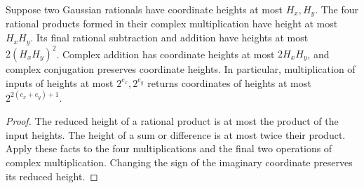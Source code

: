 \begin{lemma}
    \label{lem:lvv_complex_arithmetic_heights}
    \leanok
    Suppose two Gaussian rationals have coordinate heights at most
    $H_x,H_y$. The four rational products formed in their complex
    multiplication have height at most $H_xH_y$. Its final rational
    subtraction and addition have heights at most $2(H_xH_y)^2$.
    Complex addition has coordinate heights at most $2H_xH_y$, and
    complex conjugation preserves coordinate heights.
    In particular, multiplication of inputs of heights at most
    $2^{e_x},2^{e_y}$ returns coordinates of heights at most
    $2^{2(e_x+e_y)+1}$.
\end{lemma}
\begin{proof}\leanok
    The reduced height of a rational product is at most the product of
    the input heights. The height of a sum or difference is at most
    twice their product. Apply these facts to the four multiplications
    and the final two operations of complex multiplication. Changing
    the sign of the imaginary coordinate preserves its reduced height.
\end{proof}

